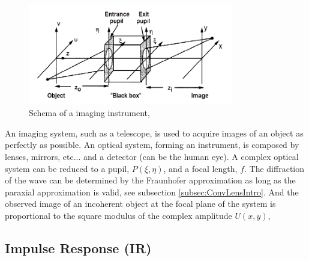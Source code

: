 \begin{figure}
\begin{center}
\includegraphics[width=0.8\textwidth,angle=0]{Figures/ImagingInstrumentGenSchema}
\decoRule
\caption{Schema of a imaging instrument, \citep[Chapter 6.1]{goodman_1968}}
\label{fig:ImagingInstrumentGenSchema}
\end{center}
\end{figure}

An imaging system, such as a telescope, is used to acquire images of an object as perfectly as possible. An optical system,  forming an instrument, is composed by lenses, mirrors, etc... and a detector (can be the human eye). A complex optical system can be reduced to a pupil, $P(\xi,\eta)$, and a focal length, $f$. The diffraction of the wave can be determined by the Fraunhofer approximation as long as the paraxial approximation is valid, see subsection \ref{subsec:ConvLensIntro}. And the observed image of an incoherent object at the focal plane of the system is proportional to the square modulus of the complex amplitude $U(x,y)$,


\subsection{Impulse Response (IR)}
\label{subsec:IR}


